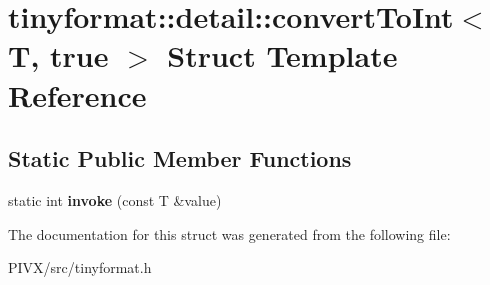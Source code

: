 \hypertarget{structtinyformat_1_1detail_1_1convert_to_int_3_01_t_00_01true_01_4}{}\section{tinyformat\+:\+:detail\+:\+:convert\+To\+Int$<$ T, true $>$ Struct Template Reference}
\label{structtinyformat_1_1detail_1_1convert_to_int_3_01_t_00_01true_01_4}
\subsection*{Static Public Member Functions}
\begin{DoxyCompactItemize}
\item 
\mbox{\label{structtinyformat_1_1detail_1_1convert_to_int_3_01_t_00_01true_01_4_a7d03793b995eb4428bb13349004f5fcd}} 
static int {\bfseries invoke} (const T \&value)
\end{DoxyCompactItemize}


The documentation for this struct was generated from the following file\+:\begin{DoxyCompactItemize}
\item 
P\+I\+V\+X/src/tinyformat.\+h\end{DoxyCompactItemize}
